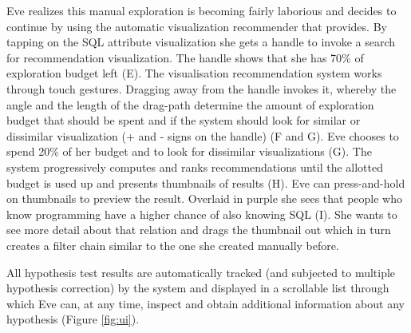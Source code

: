 Eve realizes this manual exploration is becoming fairly laborious and decides to continue by using the automatic visualization recommender that \system{} provides. By tapping on the SQL attribute visualization she gets a handle to invoke a search for recommendation visualization. The handle shows that she has 70\% of exploration budget left (E). The visualisation recommendation system works through touch gestures. Dragging away from the handle invokes it, whereby the angle and the length of the drag-path determine the amount of exploration budget that should be spent and if the system should look for similar or dissimilar visualization (+ and - signs on the handle) (F and G). Eve chooses to spend 20\% of her budget and to look for dissimilar visualizations (G). The system progressively computes and ranks recommendations until the allotted budget is used up and presents thumbnails of results (H). Eve can press-and-hold on thumbnails to preview the result. Overlaid in purple she sees that people who know programming have a higher chance of also knowing SQL (I). She wants to see more detail about that relation and drags the thumbnail out which in turn creates a filter chain similar to the one she created manually before. 

All hypothesis test results are automatically tracked (and subjected to multiple hypothesis correction) by the system and displayed in a scrollable list through which Eve can, at any time, inspect and obtain additional information about any hypothesis (Figure \ref{fig:ui}). 

